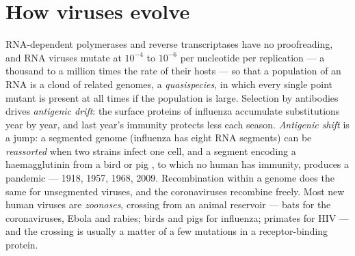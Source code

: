 \section{How viruses evolve}

\begin{definition}\label{def:b3:virology:evolution}
RNA-dependent polymerases and reverse transcriptases have no
proofreading, and RNA viruses mutate at $10^{-4}$ to $10^{-6}$ per
nucleotide per replication --- a thousand to a million times the rate
of their hosts --- so that a population of an RNA  is a cloud of
related genomes, a \emph{quasispecies}, in which every single point
mutant is present at all times if the population is large. Selection
by antibodies drives \emph{antigenic drift}: the surface proteins of
influenza accumulate substitutions year by year, and last year's
immunity protects less each season. \emph{Antigenic shift} is a jump: a
segmented genome (influenza has eight RNA segments) can be
\emph{reassorted} when two strains infect one cell, and a segment
encoding a haemagglutinin from a bird or pig , to which no human
has immunity, produces a pandemic --- 1918, 1957, 1968, 2009.
Recombination within a genome does the same for unsegmented viruses,
and the coronaviruses recombine freely. Most new human viruses are
\emph{zoonoses}, crossing from an animal reservoir --- bats for the
coronaviruses, Ebola and rabies; birds and pigs for influenza; primates
for HIV --- and the crossing is usually a matter of a few mutations in a
receptor-binding protein.
\end{definition}

